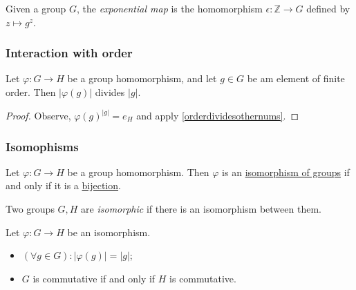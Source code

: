 \label{exponentialmap}
Given a group $G$, the \emph{exponential map} is the homomorphism $\epsilon : \mathbb{Z} \rightarrow G$ defined by $z \mapsto g^z$.

\subsubsection{Interaction with order}\label{homomorphismsandorder}

\begin{proposition}
Let $\varphi : G \rightarrow H$ be a group homomorphism, and let $g \in G$ be am element of finite order. Then $|\varphi(g)|$ divides $|g|$.
\end{proposition}

\begin{proof}
Observe, $\varphi(g)^{|g|} = e_H$ and apply \ref{orderdividesothernums}.
\end{proof}

\subsubsection{Isomophisms}\label{groupisomorphisms}
\begin{proposition}
Let $\varphi : G \rightarrow H$ be a group homomorphism. Then $\varphi$ is an \hyperref[isomorphism]{isomorphism of groups} if
and only if it is a \hyperref[bijection]{bijection}.
\end{proposition}

\noindent Two groups $G,H$ are \emph{isomorphic}\label{isomorphicgroups} if there is an isomorphism between them.

\begin{proposition}
Let $\varphi : G \rightarrow H$ be an isomorphism.
\begin{itemize}
  \item $(\forall g \in G) : |\varphi(g)| = |g|$;
  \item $G$ is commutative if and only if $H$ is commutative.
\end{itemize}
\end{proposition}